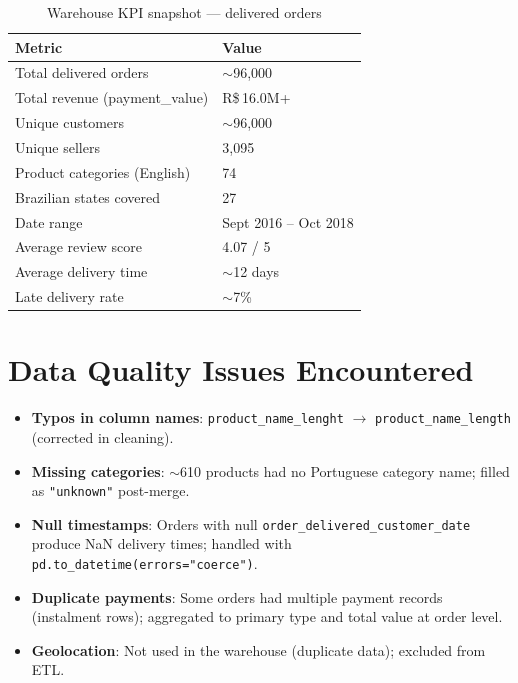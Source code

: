 \documentclass[12pt,a4paper]{report}
\begin{document}
\begin{table}[H]
  \centering
  \caption{Warehouse KPI snapshot — delivered orders}
  \label{tab:kpis}
  \renewcommand{\arraystretch}{1.3}
  \begin{tabular}{ll}
    \toprule
    \textbf{Metric} & \textbf{Value} \\
    \midrule
    Total delivered orders       & $\sim$96,000 \\
    Total revenue (payment\_value) & R\$\,16.0M+ \\
    Unique customers             & $\sim$96,000 \\
    Unique sellers               & 3,095 \\
    Product categories (English) & 74 \\
    Brazilian states covered     & 27 \\
    Date range                   & Sept 2016 -- Oct 2018 \\
    Average review score         & 4.07 / 5 \\
    Average delivery time        & $\sim$12 days \\
    Late delivery rate           & $\sim$7\% \\
    \bottomrule
  \end{tabular}
\end{table}

\section{Data Quality Issues Encountered}

\begin{itemize}[leftmargin=*]
  \item \textbf{Typos in column names}: \texttt{product\_name\_lenght} $\to$
        \texttt{product\_name\_length} (corrected in cleaning).
  \item \textbf{Missing categories}: $\sim$610 products had no Portuguese category name;
        filled as \texttt{"unknown"} post-merge.
  \item \textbf{Null timestamps}: Orders with null \texttt{order\_delivered\_customer\_date}
        produce NaN delivery times; handled with \texttt{pd.to\_datetime(errors="coerce")}.
  \item \textbf{Duplicate payments}: Some orders had multiple payment records (instalment rows);
        aggregated to primary type and total value at order level.
  \item \textbf{Geolocation}: Not used in the warehouse (duplicate data); excluded from ETL.
\end{itemize}
\end{document}
